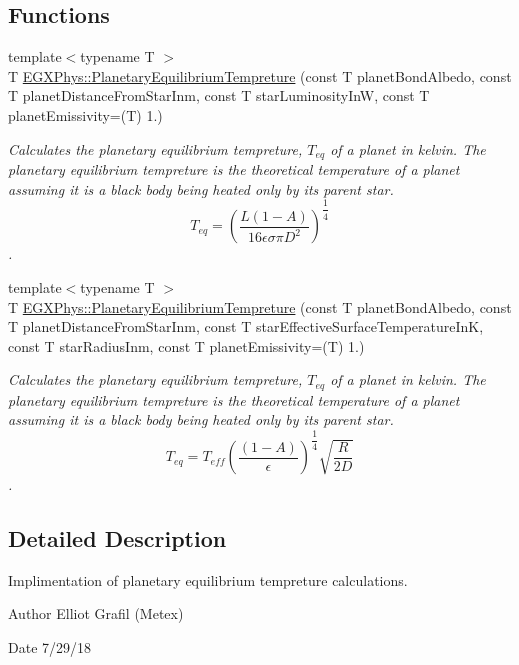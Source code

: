 \subsection*{Functions}
\begin{DoxyCompactItemize}
\item 
{\footnotesize template$<$typename T $>$ }\\T \mbox{\hyperlink{group___e_g_x_phys-_astrophysics-_planetary_equilibrium_tempreture_ga48b1c3c35c18036586685da25085d05b}{E\+G\+X\+Phys\+::\+Planetary\+Equilibrium\+Tempreture}} (const T planet\+Bond\+Albedo, const T planet\+Distance\+From\+Star\+Inm, const T star\+Luminosity\+InW, const T planet\+Emissivity=(T) 1.)
\begin{DoxyCompactList}\small\item\em Calculates the planetary equilibrium tempreture, $T_{eq}$ of a planet in kelvin. The planetary equilibrium tempreture is the theoretical temperature of a planet assuming it is a black body being heated only by its parent star. \[ T_{eq}=\left ( \dfrac{L (1-A)}{16 \epsilon \sigma \pi D^2} \right )^{\dfrac{1}{4}} \]. \end{DoxyCompactList}\item 
{\footnotesize template$<$typename T $>$ }\\T \mbox{\hyperlink{group___e_g_x_phys-_astrophysics-_planetary_equilibrium_tempreture_ga4a6704ad5d483e07453bcd01ba5f66c3}{E\+G\+X\+Phys\+::\+Planetary\+Equilibrium\+Tempreture}} (const T planet\+Bond\+Albedo, const T planet\+Distance\+From\+Star\+Inm, const T star\+Effective\+Surface\+Temperature\+InK, const T star\+Radius\+Inm, const T planet\+Emissivity=(T) 1.)
\begin{DoxyCompactList}\small\item\em Calculates the planetary equilibrium tempreture, $T_{eq}$ of a planet in kelvin. The planetary equilibrium tempreture is the theoretical temperature of a planet assuming it is a black body being heated only by its parent star. \[ T_{eq}=T_{eff} \left ( \dfrac{(1-A)}{\epsilon} \right )^{\dfrac{1}{4}} \sqrt{\dfrac{R}{2 D}} \]. \end{DoxyCompactList}\end{DoxyCompactItemize}


\subsection{Detailed Description}
Implimentation of planetary equilibrium tempreture calculations. 

\begin{DoxyAuthor}{Author}
Elliot Grafil (Metex) 
\end{DoxyAuthor}
\begin{DoxyDate}{Date}
7/29/18 
\end{DoxyDate}
